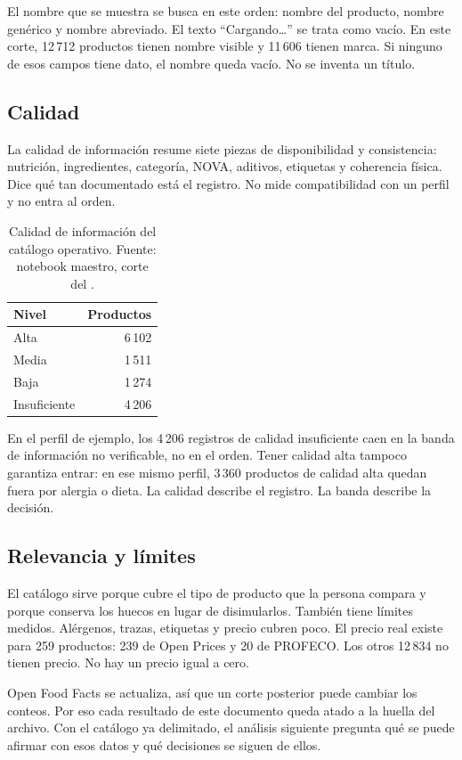 El nombre que se muestra se busca en este orden: nombre del producto, nombre genérico y nombre abreviado. El texto \enquote{Cargando…} se trata como vacío. En este corte, 12\,712 productos tienen nombre visible y 11\,606 tienen marca. Si ninguno de esos campos tiene dato, el nombre queda vacío. No se inventa un título.

\subsection{Calidad}

La calidad de información resume siete piezas de disponibilidad y consistencia: nutrición, ingredientes, categoría, NOVA, aditivos, etiquetas y coherencia física. Dice qué tan documentado está el registro. No mide compatibilidad con un perfil y no entra al orden.

\begin{table}[ht]
  \centering
  \caption{Calidad de información del catálogo operativo. Fuente: notebook maestro, corte del \corte.}
  \label{tab:calidad}
  \begin{tabular}{lr}
    \toprule
    Nivel & Productos \\
    \midrule
    Alta & 6\,102 \\
    Media & 1\,511 \\
    Baja & 1\,274 \\
    Insuficiente & 4\,206 \\
    \bottomrule
  \end{tabular}
\end{table}

En el perfil de ejemplo, los 4\,206 registros de calidad insuficiente caen en la banda de información no verificable, no en el orden. Tener calidad alta tampoco garantiza entrar: en ese mismo perfil, 3\,360 productos de calidad alta quedan fuera por alergia o dieta. La calidad describe el registro. La banda describe la decisión.

\subsection{Relevancia y límites}

El catálogo sirve porque cubre el tipo de producto que la persona compara y porque conserva los huecos en lugar de disimularlos. También tiene límites medidos. Alérgenos, trazas, etiquetas y precio cubren poco. El precio real existe para 259 productos: 239 de Open Prices y 20 de PROFECO. Los otros 12\,834 no tienen precio. No hay un precio igual a cero.

Open Food Facts se actualiza, así que un corte posterior puede cambiar los conteos. Por eso cada resultado de este documento queda atado a la huella del archivo. Con el catálogo ya delimitado, el análisis siguiente pregunta qué se puede afirmar con esos datos y qué decisiones se siguen de ellos.

